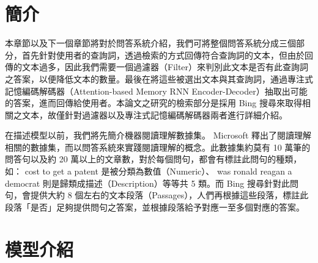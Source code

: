 \section{簡介}
本章節以及下一個章節將對於問答系統介紹，我們可將整個問答系統分成三個部分，首先針對使用者的查詢詞，透過檢索的方式回傳符合查詢詞的文本，但由於回傳的文本過多，因此我們需要一個過濾器（Filter）來判別此文本是否有此查詢詞之答案，以便降低文本的數量。最後在將這些被選出文本與其查詢詞，通過專注式記憶編碼解碼器（Attention-based Memory RNN Encoder-Decoder）抽取出可能的答案，進而回傳給使用者。本論文之研究的檢索部分是採用 Bing 搜尋來取得相關之文本，故僅針對過濾器以及專注式記憶編碼解碼器兩者進行詳細介紹。

在描述模型以前，我們將先簡介機器閱讀理解數據集。 Microsoft 釋出了閱讀理解相關的數據集，而以問答系統來實踐閱讀理解的概念。此數據集約莫有 10 萬筆的問答句以及約 20 萬以上的文章數，對於每個問句，都會有標註此問句的種類，如： cost to get a patent 是被分類為數值（Numeric）、 was ronald reagan a democrat 則是歸類成描述（Description）等等共 5 類。而 Bing 搜尋針對此問句，會提供大約 8 個左右的文本段落（Passages），人們再根據這些段落，標註此段落「是否」足夠提供問句之答案，並根據段落給予對應一至多個對應的答案。

\section{模型介紹}
